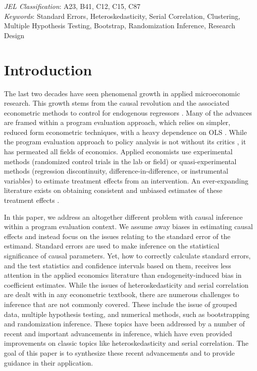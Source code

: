 \documentclass[11pt]{article}
\begin{document}
		
{\small \noindent\emph{JEL Classification}: A23, B41, C12, C15, C87
\\
\emph{Keywords}: Standard Errors, Heteroskedasticity, Serial Correlation, Clustering, Multiple Hypothesis Testing, Bootstrap, Randomization Inference, Research Design}



\newpage	
\doublespacing
\section{Introduction}
The last two decades have seen phenomenal growth in applied microeconomic research. This growth stems from the causal revolution and the associated econometric methods to control for endogenous regressors \citep{angrist_mostly_2009}. Many of the advances are framed within a program evaluation approach, which relies on simpler, reduced form econometric techniques, with a heavy dependence on OLS \citep{abadie_econometric_2018}. While the program evaluation approach to policy analysis is not without its critics \citep{deaton_instruments_2010, heckman_building_2010}, it has permeated all fields of economics. Applied economists use experimental methods (randomized control trials in the lab or field) or quasi-experimental methods (regression discontinuity, difference-in-difference, or instrumental variables) to estimate treatment effects from an intervention. An ever-expanding literature exists on obtaining consistent and unbiased estimates of these treatment effects \citep{deaton_instruments_2010, heckman_building_2010, imbens_better_2010, belloni_high-dimensional_2014, imbens_causal_2015, morgan_counterfactuals_2015, abadie_econometric_2018}.

In this paper, we address an altogether different problem with causal inference within a program evaluation context. We assume away biases in estimating causal effects and instead focus on the issues relating to the standard error of the estimand. Standard errors are used to make inference on the statistical significance of causal parameters. Yet, how to correctly calculate standard errors, and the test statistics and confidence intervals based on them, receives less attention in the applied economics literature than endogeneity-induced bias in coefficient estimates. While the issues of heteroskedasticity and serial correlation are dealt with in any econometric textbook, there are numerous challenges to inference that are not commonly covered. These include the issue of grouped data, multiple hypothesis testing, and numerical methods, such as bootstrapping and randomization inference. These topics have been addressed by a number of recent and important advancements in inference, which have even provided improvements on classic topics like heteroskedasticity and serial correlation. The goal of this paper is to synthesize these recent advancements and to provide guidance in their application.
\end{document}
